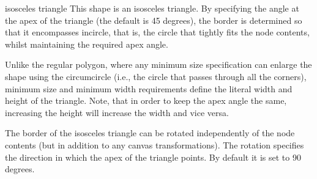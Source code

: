 \begin{shape}{isosceles triangle}
	This shape is an isosceles triangle.
	By specifying the angle at the apex of the triangle (the default is
	45 degrees), the border is determined so that it encompasses
	incircle, that is, the circle that tightly fits the node contents,
	whilst maintaining the required apex angle. 
	
\begin{codeexample}[]
\end{codeexample}	

   Unlike the regular polygon, where any minimum size specification
   can enlarge the shape using the circumcircle (i.e., the circle 
   that passes through all the corners), minimum size and minimum 
   width requirements define the literal width and height of the 
   triangle.
   Note, that in order to keep the apex angle the same, increasing
   the height will increase the width and vice versa. 
   
   
\begin{codeexample}[]
\end{codeexample}	

	The border of the	isosceles triangle can be rotated independently of 
	the node contents (but in addition to any canvas transformations).
	The rotation specifies the direction in which the apex of the 
	triangle points. By default it is set to 90 degrees.
	
\begin{codeexample}[]
\end{codeexample}	


\end{shape}
